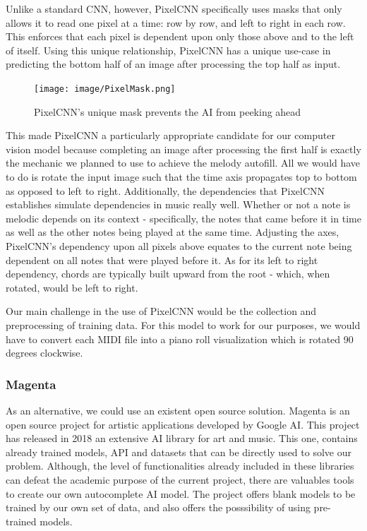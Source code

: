 Unlike a standard CNN, however, PixelCNN specifically uses masks that only allows it to
read one pixel at a time: row by row, and left to right in each row. This enforces that
each pixel is dependent upon only those above and to the left of itself. Using this unique
relationship, PixelCNN has a unique use-case in predicting the bottom half of an image
after processing the top half as input.

\begin{figure}[h!]
  \centering
  \texttt{[image: image/PixelMask.png]}
  \caption{PixelCNN's unique mask prevents the AI from peeking ahead}
  \label{fig:pixel_mask}
\end{figure}

This made PixelCNN a particularly appropriate candidate for our computer vision model
because completing an image after processing the first half is exactly the mechanic we
planned to use to achieve the melody autofill. All we would have to do is rotate the input
image such that the time axis propagates top to bottom as opposed to left to right.
Additionally, the dependencies that PixelCNN establishes simulate dependencies in music
really well. Whether or not a note is melodic depends on its context - specifically, the
notes that came before it in time as well as the other notes being played at the same
time. Adjusting the axes, PixelCNN's dependency upon all pixels above equates to the
current note being dependent on all notes that were played before it. As for its left to
right dependency, chords are typically built upward from the root - which, when rotated,
would be left to right.

Our main challenge in the use of PixelCNN would be the collection and preprocessing of
training data. For this model to work for our purposes, we would have to convert each MIDI
file into a piano roll visualization which is rotated 90 degrees clockwise.

\subsubsection{Magenta}

As an alternative, we could use an existent open source solution. Magenta is an open
source project for artistic applications developed by Google AI\autocite{magentaHome}.
This project has released in 2018 an extensive AI library for art and music. This one,
contains already trained models, API and datasets that can be directly used to solve our
problem. Although, the level of functionalities already included in these libraries can
defeat the academic purpose of the current project, there are valuables tools to create
our own autocomplete AI model. The project offers blank models to be trained by our own
set of data, and also offers the posssibility of using pre-trained models.

